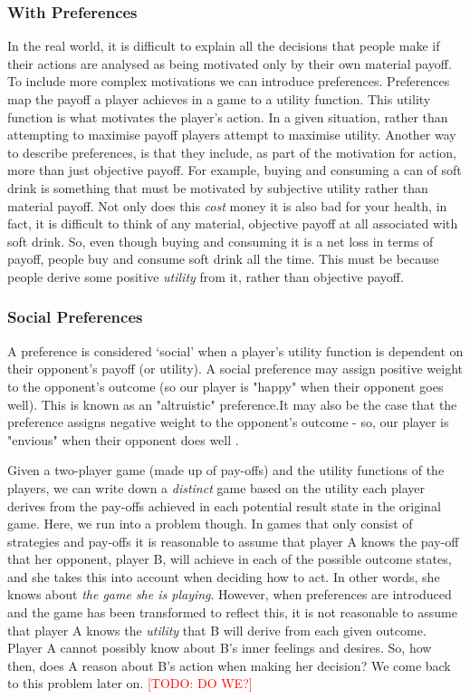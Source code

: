 \documentclass[11pt]{article}
\newcommand{\todo}[1]{\textcolor{red}{[TODO: #1]}\PackageWarning{TODO:}{#1!}}
\newcommand*{\np}{\par\noindent\newline}
\begin{document}
\subsubsection{With Preferences}
In the real world, it is difficult to explain all the decisions that people
make if their actions are analysed as being motivated only by their own
material payoff. To include more complex motivations we can introduce
preferences. Preferences map the payoff a player achieves in a game to a
utility function. This utility function is what motivates the player's action.
In a given situation, rather than attempting to maximise payoff players attempt
to maximise utility. Another way to describe preferences, is that they include,
as part of the motivation for action, more than just objective payoff. For
example, buying and consuming a can of soft drink is something that must be
motivated by subjective utility rather than material payoff. Not only does this
\textit{cost} money it is also bad for your health, in fact, it is difficult to
think of any material, objective payoff at all associated with soft drink. So,
even though buying and consuming it is a net loss in terms of payoff, people
buy and consume soft drink all the time. This must be because people derive
some positive \textit{utility} from it, rather than objective payoff.

\subsubsection{Social Preferences}
A preference is considered `social' when a player's utility function is
dependent on their opponent's payoff (or utility). A social preference may
assign positive weight to the opponent's outcome (so our player is "happy" when
their opponent goes well). This is known as an "altruistic" preference.It may
also be the case that the preference assigns negative weight to the opponent's
outcome - so, our player is "envious" when their opponent does well
\cite{angner_course_2012}.
\np Given a two-player game (made up of pay-offs) and the utility functions of
the players, we can write down a \textit{distinct} game based on the utility
each player derives from the pay-offs achieved in each potential result state
in the original game. Here, we run into a problem though. In games that
only consist of strategies and pay-offs it is reasonable to assume that player
A knows the pay-off that her opponent, player B, will achieve in each of the
possible outcome states, and she takes this into account when deciding how to
act. In other words, she knows about \textit{the game she is playing}. However,
when preferences are introduced and the game has been transformed to reflect
this, it is not reasonable to assume that player A knows the \textit{utility}
that B will derive from each given outcome. Player A cannot possibly know about
B's inner feelings and desires. So, how then, does A reason about B's action
when making her decision? We come back to this problem later on. \todo{DO WE?}
\end{document}
